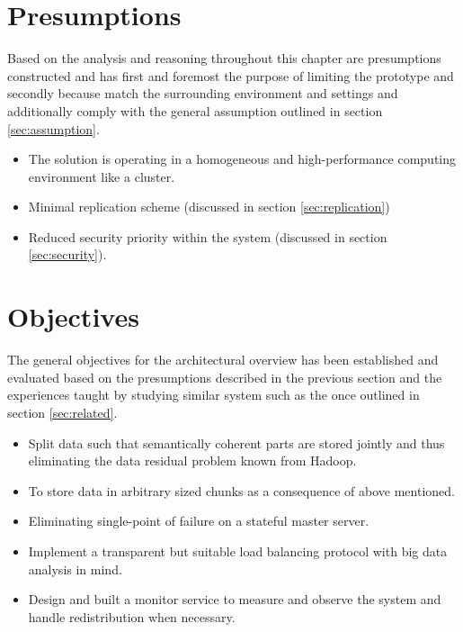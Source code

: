 \section{Presumptions} \label{sec:presumptions}
Based on the analysis and reasoning throughout this chapter are presumptions constructed and has first and foremost the purpose of limiting the prototype and secondly because match the surrounding environment and settings and additionally comply with the general assumption outlined in section \ref{sec:assumption}.

\vspace*{2mm}
\begin{itemize}
	\item The solution is operating in a homogeneous and high-performance computing environment like a cluster.
	\item Minimal replication scheme (discussed in section \ref{sec:replication})
	\item Reduced security priority within the system (discussed in section \ref{sec:security}).
\end{itemize}
\vspace*{3mm}

\section{Objectives} \label{sec:objectives}
The general objectives for the architectural overview has been established and evaluated based on the presumptions described in the previous section and the experiences taught by studying similar system such as the once outlined in section \ref{sec:related}.

\vspace*{3mm}
\begin{itemize}
	\item Split data such that semantically coherent parts are stored jointly and thus eliminating the data residual problem known from Hadoop.
	\item To store data in arbitrary sized chunks as a consequence of above mentioned.
	\item Eliminating single-point of failure on a stateful master server.
	\item Implement a transparent but suitable load balancing protocol with big data analysis in mind.
	\item Design and built a monitor service to measure and observe the system and handle redistribution when necessary.
\end{itemize}
\vspace*{3mm}

